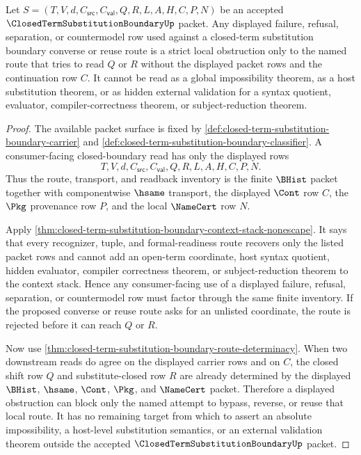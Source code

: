 \begin{corollary}
\label{cor:closed-term-substitution-boundary-route-determinacy-strict-obstruction}
Let $S=(T,V,d,C_{\mathsf{src}},C_{\mathsf{val}},Q,R,L,A,H,C,P,N)$ be an accepted $\ClosedTermSubstitutionBoundaryUp$ packet. Any displayed failure, refusal, separation, or countermodel row used against a closed-term substitution boundary converse or reuse route is a strict local obstruction only to the named route that tries to read $Q$ or $R$ without the displayed packet rows and the continuation row $C$. It cannot be read as a global impossibility theorem, as a host substitution theorem, or as hidden external validation for a syntax quotient, evaluator, compiler-correctness theorem, or subject-reduction theorem.
\end{corollary}
\begin{proof}
The available packet surface is fixed by \autoref{def:closed-term-substitution-boundary-carrier} and \autoref{def:closed-term-substitution-boundary-classifier}. A consumer-facing closed-boundary read has only the displayed rows
$$
T,V,d,C_{\mathsf{src}},C_{\mathsf{val}},Q,R,L,A,H,C,P,N.
$$
Thus the route, transport, and readback inventory is the finite $\BHist$ packet together with componentwise $\hsame$ transport, the displayed $\Cont$ row $C$, the $\Pkg$ provenance row $P$, and the local $\NameCert$ row $N$.

Apply \autoref{thm:closed-term-substitution-boundary-context-stack-nonescape}. It says that every recognizer, tuple, and formal-readiness route recovers only the listed packet rows and cannot add an open-term coordinate, host syntax quotient, hidden evaluator, compiler correctness theorem, or subject-reduction theorem to the context stack. Hence any consumer-facing use of a displayed failure, refusal, separation, or countermodel row must factor through the same finite inventory. If the proposed converse or reuse route asks for an unlisted coordinate, the route is rejected before it can reach $Q$ or $R$.

Now use \autoref{thm:closed-term-substitution-boundary-route-determinacy}. When two downstream reads do agree on the displayed carrier rows and on $C$, the closed shift row $Q$ and substitute-closed row $R$ are already determined by the displayed $\BHist$, $\hsame$, $\Cont$, $\Pkg$, and $\NameCert$ packet. Therefore a displayed obstruction can block only the named attempt to bypass, reverse, or reuse that local route. It has no remaining target from which to assert an absolute impossibility, a host-level substitution semantics, or an external validation theorem outside the accepted $\ClosedTermSubstitutionBoundaryUp$ packet.
\end{proof}
